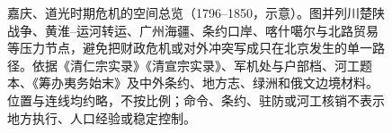 \begin{figure}[htbp]
  \caption{嘉庆、道光时期危机的空间总览（1796--1850，示意）。图并列川楚陕战争、黄淮--运河转运、广州海疆、条约口岸、喀什噶尔与北路贸易等压力节点，避免把财政危机或对外冲突写成只在北京发生的单一路径。依据《清仁宗实录》《清宣宗实录》、军机处与户部档、河工题本、《筹办夷务始末》及中外条约、地方志、绿洲和俄文边境材料。位置与连线均约略，不按比例；命令、条约、驻防或河工核销不表示地方执行、人口经验或稳定控制。}
  \label{fig:mid-qing-crisis-overview}
\end{figure}
